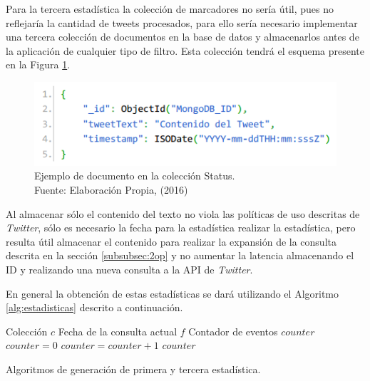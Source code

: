 Para la tercera estadística la colección de marcadores no sería útil, pues no reflejaría la cantidad de tweets procesados, para ello sería necesario implementar una tercera colección de documentos en la base de datos y almacenarlos antes de la aplicación de cualquier tipo de filtro. Esta colección tendrá el esquema presente en la Figura \ref{fig:esquemaTweet}.

\begin{figure}[H]
	\centering
	\captionsetup{justification=centering}
	\includegraphics[scale=0.8]{images/status.png}
	\caption[Ejemplo de documento en la colección Status.]{Ejemplo de documento en la colección Status.\\Fuente: Elaboración Propia, (2016)}
	\label{fig:esquemaTweet}
\end{figure}

Al almacenar sólo el contenido del texto no viola las políticas de uso descritas de \textit{Twitter}, sólo es necesario la fecha para la estadística realizar la estadística, pero resulta útil almacenar el contenido para realizar la expansión de la consulta descrita en la sección \ref{subsubsec:2op} y no aumentar la latencia almacenando el ID y realizando una nueva consulta a la API de \textit{Twitter}.

En general la obtención de estas estadísticas se dará utilizando el Algoritmo \ref{alg:estadisticas} descrito a continuación.\\

\begin{algorithm}[H]
	\begin{algorithmic}
		\REQUIRE Colección $c$ 
		\REQUIRE Fecha de la consulta actual $f$ 
		\ENSURE Contador de eventos $counter$  
		\STATE $counter = 0$
				\STATE $counter = counter + 1$
			\ENDIF	
		\ENDFOR
		\RETURN $counter$
	\end{algorithmic}
	\caption{Algoritmos de generación de primera y tercera estadística.}
	\label{alg:estadisticas}
\end{algorithm}\vphantom\\

